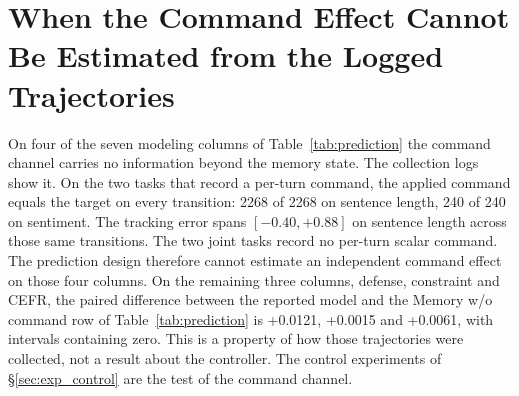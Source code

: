 \section{When the Command Effect Cannot Be Estimated from the Logged Trajectories}
\label{app:A7_command_channel}

On four of the seven modeling columns of Table~\ref{tab:prediction} the command channel carries no information beyond the memory state.  %
The collection logs show it. On the two tasks that record a per-turn command, the applied command equals the target on every transition: 2268 of 2268 on sentence length, 240 of 240 on sentiment. The tracking error spans $[-0.40, +0.88]$ on sentence length across those same transitions.  %
The two joint tasks record no per-turn scalar command.  %
The prediction design therefore cannot estimate an independent command effect on those four columns.  %
On the remaining three columns, defense, constraint and CEFR, the paired difference between the reported model and the Memory w/o command row of Table~\ref{tab:prediction} is +0.0121, +0.0015 and +0.0061, with intervals containing zero.  %
This is a property of how those trajectories were collected, not a result about the controller.  %
The control experiments of \S\ref{sec:exp_control} are the test of the command channel.  %
